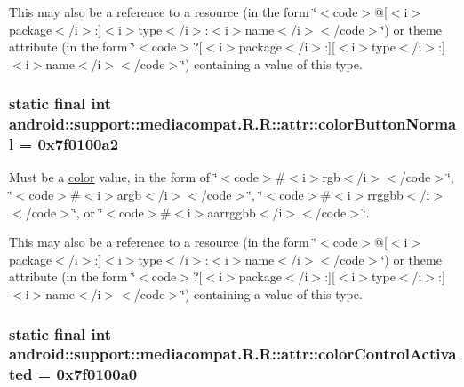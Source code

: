 This may also be a reference to a resource (in the form \char`\"{}$<$code$>$@\mbox{[}$<$i$>$package$<$/i$>$:\mbox{]}$<$i$>$type$<$/i$>$:$<$i$>$name$<$/i$>$$<$/code$>$\char`\"{}) or theme attribute (in the form \char`\"{}$<$code$>$?\mbox{[}$<$i$>$package$<$/i$>$:\mbox{]}\mbox{[}$<$i$>$type$<$/i$>$:\mbox{]}$<$i$>$name$<$/i$>$$<$/code$>$\char`\"{}) containing a value of this type. \hypertarget{classandroid_1_1support_1_1mediacompat_1_1_r_1_1attr_110e1f2238d8bd2e95a3f1083ed86bad}{
\subsubsection[{colorButtonNormal}]{\setlength{\rightskip}{0pt plus 5cm}static final int android::support::mediacompat.R.R::attr::colorButtonNormal = 0x7f0100a2}}
\label{classandroid_1_1support_1_1mediacompat_1_1_r_1_1attr_110e1f2238d8bd2e95a3f1083ed86bad}


Must be a \hyperlink{classandroid_1_1support_1_1mediacompat_1_1_r_1_1color}{color} value, in the form of \char`\"{}$<$code$>$\#$<$i$>$rgb$<$/i$>$$<$/code$>$\char`\"{}, \char`\"{}$<$code$>$\#$<$i$>$argb$<$/i$>$$<$/code$>$\char`\"{}, \char`\"{}$<$code$>$\#$<$i$>$rrggbb$<$/i$>$$<$/code$>$\char`\"{}, or \char`\"{}$<$code$>$\#$<$i$>$aarrggbb$<$/i$>$$<$/code$>$\char`\"{}. 

This may also be a reference to a resource (in the form \char`\"{}$<$code$>$@\mbox{[}$<$i$>$package$<$/i$>$:\mbox{]}$<$i$>$type$<$/i$>$:$<$i$>$name$<$/i$>$$<$/code$>$\char`\"{}) or theme attribute (in the form \char`\"{}$<$code$>$?\mbox{[}$<$i$>$package$<$/i$>$:\mbox{]}\mbox{[}$<$i$>$type$<$/i$>$:\mbox{]}$<$i$>$name$<$/i$>$$<$/code$>$\char`\"{}) containing a value of this type. \hypertarget{classandroid_1_1support_1_1mediacompat_1_1_r_1_1attr_5a483f9685ffc8713bfe712a31a48786}{
\subsubsection[{colorControlActivated}]{\setlength{\rightskip}{0pt plus 5cm}static final int android::support::mediacompat.R.R::attr::colorControlActivated = 0x7f0100a0}}
\label{classandroid_1_1support_1_1mediacompat_1_1_r_1_1attr_5a483f9685ffc8713bfe712a31a48786}



